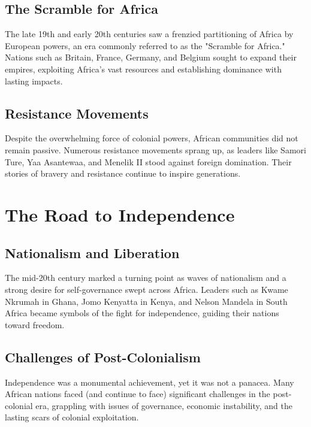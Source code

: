 \documentclass{book}
\begin{document}
\subsection{The Scramble for Africa}
\label{subsec:scramble-for-africa}

The late 19th and early 20th centuries saw a frenzied partitioning of Africa by European powers, an era commonly referred to as the "Scramble for Africa." Nations such as Britain, France, Germany, and Belgium sought to expand their empires, exploiting Africa’s vast resources and establishing dominance with lasting impacts.

\subsection{Resistance Movements}
\label{subsec:resistance-movements}

Despite the overwhelming force of colonial powers, African communities did not remain passive. Numerous resistance movements sprang up, as leaders like Samori Ture, Yaa Asantewaa, and Menelik II stood against foreign domination. Their stories of bravery and resistance continue to inspire generations.

\section{The Road to Independence}
\label{sec:road-to-independence}

\subsection{Nationalism and Liberation}
\label{subsec:nationalism-and-liberation}

The mid-20th century marked a turning point as waves of nationalism and a strong desire for self-governance swept across Africa. Leaders such as Kwame Nkrumah in Ghana, Jomo Kenyatta in Kenya, and Nelson Mandela in South Africa became symbols of the fight for independence, guiding their nations toward freedom.

\subsection{Challenges of Post-Colonialism}
\label{subsec:challenges-of-post-colonialism}

Independence was a monumental achievement, yet it was not a panacea. Many African nations faced (and continue to face) significant challenges in the post-colonial era, grappling with issues of governance, economic instability, and the lasting scars of colonial exploitation.
\end{document}
